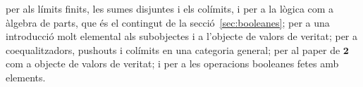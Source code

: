 \begin{resumcap}
 \cite[cap.~3 i~4]{lawvere-rosebrugh} per als límits finits, les sumes disjuntes i els colímits, i \cite[apèndix~A]{lawvere-rosebrugh} per a la lògica com a àlgebra de parts, que és el contingut de la secció~\ref{sec:booleanes}; \cite[article~VI, sessions~32--33]{lawvere-schanuel} per a una introducció molt elemental als subobjectes i a l'objecte de valors de veritat; \cite[§§3.2--3.4 i §5.4]{awodey} per a coequalitzadors, pushouts i colímits en una categoria general; \cite[pàg.~11--12]{bell2006} per al paper de \(\mathbf2\) com a objecte de valors de veritat; i \cite[§§4--5]{halmos} per a les operacions booleanes fetes amb elements.
\end{resumcap}
